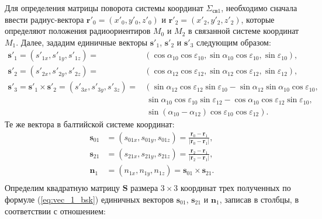 \documentclass[../main.tex]{subfiles}
\begin{document}
Для определения матрицы поворота системы координат $\Sigma_{\text{св}1}$, необходимо сначала
ввести радиус-вектора $\mathbf{r}'_0 = \left(x'_0, y'_0, z'_0\right)$ и
$\mathbf{r}'_2 = \left(x'_2, y'_2, z'_2\right)$, которые определяют положения радиоориентиров
$M_0$ и $M_2$ в связанной системе координат $M_1$. Далее, зададим единичные векторы
$\mathbf{s}'_1$, $\mathbf{s}'_2$ и $\mathbf{s}'_3$ следующим образом:
\begin{equation}\label{eq:vec_1_local}
    \begin{split}
    \mathbf{s}'_1 = \left(s'_{1x}, s'_{1y}, s'_{1z}\right) = &\left(\cos\alpha_{10} \cos\varepsilon_{10}, \sin\alpha_{10}\cos\varepsilon_{10}, \sin\varepsilon_{10}\right),\\
    \mathbf{s}'_2 = \left(s'_{2x}, s'_{2y}, s'_{2z}\right) = &\left(\cos\alpha_{12} \cos\varepsilon_{12}, \sin\alpha_{12}\cos\varepsilon_{12}, \sin\varepsilon_{12}\right),\\
    \mathbf{s}'_3 = \mathbf{s}'_1 \times \mathbf{s}'_2 = \left(s'_{3x}, s'_{3y}, s'_{3z}\right) = &\left(\sin\alpha_{12}\cos\varepsilon_{12}\sin\varepsilon_{10} - \sin\alpha_{12}\sin\alpha_{10}\cos\varepsilon_{10},\right.\\
    &\ \sin\alpha_{10}\cos\varepsilon_{10}\sin\varepsilon_{12} - \cos\alpha_{10}\cos\varepsilon_{12}\sin\varepsilon_{10},\\
    &\ \left.\sin\left(\alpha_{10} - \alpha_{12}\right)\cos\varepsilon_{10}\cos\varepsilon_{12}\right).
    \end{split}
\end{equation}
Те же вектора в балтийской системе координат:
\begin{equation}\label{eq:vec_1_bsk}
    \begin{split}
        \mathbf{s}_{01} &= \left(s_{01x}, s_{01y}, s_{01z}\right) = \frac{\mathbf{r}_0 - \mathbf{r}_1}{|\mathbf{r}_0 - \mathbf{r}_1|},\\
        \mathbf{s}_{21} &= \left(s_{21x}, s_{21y}, s_{21z}\right) = \frac{\mathbf{r}_2 - \mathbf{r}_1}{|\mathbf{r}_2 - \mathbf{r}_1|},\\
        \mathbf{n}_1 &= \left(n_{1x}, n_{1y}, n_{1z}\right) = \mathbf{s}_{01} \times \mathbf{s}_{21}.\\
    \end{split}
\end{equation}
Определим квадратную матрицу $\mathbf{S}$ размера $3 \times 3$ координат трех полученных по формуле (\ref{eq:vec_1_bsk}) единичных
векторов $\mathbf{s}_{01}$, $\mathbf{s}_{21}$ и $\mathbf{n}_{1}$, записав в столбцы, в соответствии с отношением:
\end{document}
